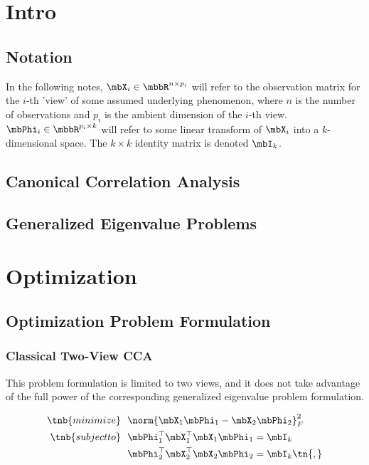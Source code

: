 \documentclass{article}
\begin{document}
\section{Intro} \label{sec:intro}

\subsection{Notation} \label{subsec:notation}

In the following notes, $\mbX_i \in \mbbR^{n \times p_i}$ will refer to the observation matrix for the $i$-th 'view' of some assumed underlying phenomenon, where $n$ is the number of observations and $p_i$ is the ambient dimension of the $i$-th view. $\mbPhi_i \in \mbbR^{p_i \times k}$ will refer to some linear transform of $\mbX_i$ into a $k$-dimensional space. The $k \times k$ identity matrix is denoted $\mbI_k$.

\subsection{Canonical Correlation Analysis} \label{subsec:cca}

\subsection{Generalized Eigenvalue Problems} \label{subsec:gep}

\section{Optimization} \label{sec:optimization}

	\subsection{Optimization Problem Formulation} \label{subsec:problemformulation}
	
	\subsubsection{Classical Two-View CCA} \label{subsubsec:classicalcca}
	
	This problem formulation is limited to two views, and it does not take advantage of the full power of the corresponding generalized eigenvalue problem formulation.
	
	\begin{align*}
		\tnb{minimize}&\ \ \norm{\mbX_1 \mbPhi_1 - \mbX_2 \mbPhi_2}_F^2\\
		\tnb{subject to}&\ \  \mbPhi_1^{\top}\mbX_1^{\top}\mbX_1\mbPhi_1 = \mbI_k\\
		&\ \ \mbPhi_2^{\top}\mbX_2^{\top}\mbX_2\mbPhi_2 = \mbI_k \tn{,}
	\end{align*}
	
\end{document}
